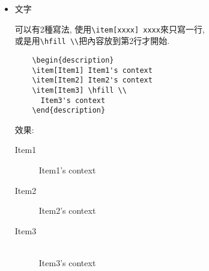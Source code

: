 \begin{itemize}
{\begin{framed}
\begin{verbatim}
    \item Item2

    \item
    {
      Item3

      Item3's context
    }

    \item
    {
      Item4

      Item4's context
    }
    \end{itemize}
  \end{verbatim}
  \end{framed}

  效果:
  \begin{itemize}
    \item Item1

    \item Item2

    \item
    {
      Item3

      Item3's context
    }

    \item
    {
      Item4

      Item4's context
    }
  \end{itemize}
  } %

  \newpage
  \item
  {
  文字

  可以有2種寫法, 使用\verb|\item[xxxx] xxxx|來只寫一行, \\
  或是用\verb|\hfill \\|把內容放到第2行才開始.

  \begin{framed}
  \begin{verbatim}
    \begin{description}
    \item[Item1] Item1's context
    \item[Item2] Item2's context
    \item[Item3] \hfill \\
      Item3's context
    \end{description}
  \end{verbatim}
  \end{framed}

  效果:
  \begin{description}
    \item[Item1] Item1's context
    \item[Item2] Item2's context
    \item[Item3] \hfill \\
    Item3's context
  \end{description}
  } %


\end{itemize}
